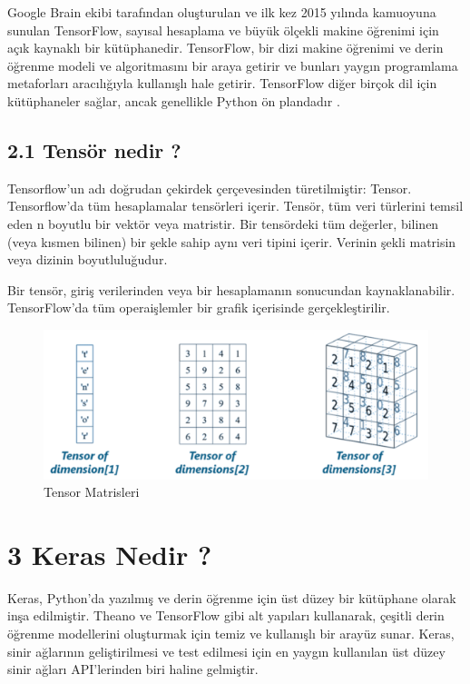 \documentclass[10pt,a4paper]{report}
\begin{document}
	Google Brain ekibi tarafından oluşturulan ve ilk kez 2015 yılında kamuoyuna sunulan TensorFlow, sayısal hesaplama ve büyük ölçekli makine öğrenimi için açık kaynaklı bir kütüphanedir. TensorFlow, bir dizi makine öğrenimi ve derin öğrenme modeli ve algoritmasını bir araya getirir ve bunları yaygın programlama metaforları aracılığıyla kullanışlı hale getirir. TensorFlow diğer birçok dil için kütüphaneler sağlar, ancak genellikle Python ön plandadır \cite{yegulalp2024}.
	
	\subsection*{2.1 Tensör nedir ?}
	
	Tensorflow'un adı doğrudan çekirdek çerçevesinden türetilmiştir: Tensor. Tensorflow'da tüm hesaplamalar tensörleri içerir. Tensör, tüm veri türlerini temsil eden n boyutlu bir vektör veya matristir. Bir tensördeki tüm değerler, bilinen (veya kısmen bilinen) bir şekle sahip aynı veri tipini içerir. Verinin şekli matrisin veya dizinin boyutluluğudur.
	
	Bir tensör, giriş verilerinden veya bir hesaplamanın sonucundan kaynaklanabilir. TensorFlow'da tüm operaişlemler bir grafik içerisinde gerçekleştirilir\cite{johnson2023}.\newline
	
	\begin{figure}[!h]
		\centering
		\includegraphics[width=\textwidth]{Tensor}
		\caption{ Tensor Matrisleri \cite{devhunter2018}}
		\label{Tensor}
	\end{figure}
	\clearpage
	
		\section*{3 Keras Nedir ? }
	Keras, Python'da yazılmış ve derin öğrenme için üst düzey bir kütüphane olarak inşa edilmiştir. Theano ve TensorFlow gibi alt yapıları kullanarak, çeşitli derin öğrenme modellerini oluşturmak için temiz ve kullanışlı bir arayüz sunar. Keras, sinir ağlarının geliştirilmesi ve test edilmesi için en yaygın kullanılan üst düzey sinir ağları API'lerinden biri haline gelmiştir.\newline
	
\end{document}
